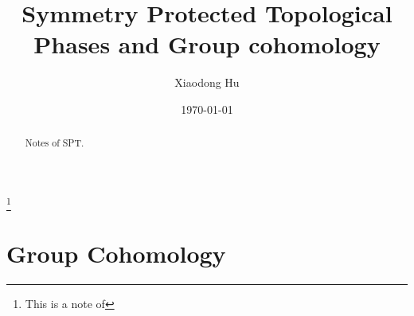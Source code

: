 \documentclass[10pt,nofootinbib]{revtex4}
\newcounter{Note}[section]
\begin{document}
\title{Symmetry Protected Topological Phases and Group cohomology}%
\thanks{This is a note of }%

\author{Xiaodong Hu}

\date{\today}


\begin{abstract}
Notes of SPT.
\end{abstract}
\maketitle
\tableofcontents
\section{Group Cohomology}
\end{document}
